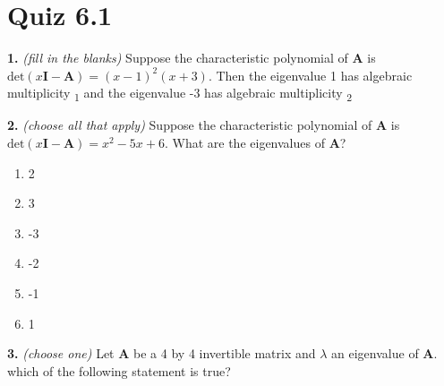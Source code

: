 \documentclass[10pt,a4paper]{article}
\begin{document}
\section{Quiz 6.1}
\textbf{1.} \textit{(fill in the blanks)} Suppose the characteristic polynomial of \(\mathbf{A}\) is \(\text{det}(x\mathbf{I}-\mathbf{A})=(x-1)^2(x+3)\). Then the eigenvalue 1 has algebraic multiplicity  \underline{\hspace{1.2cm}}\textsubscript{1} 
 and the eigenvalue -3 has algebraic multiplicity  \underline{\hspace{1.2cm}}\textsubscript{2}

\smallskip
\textbf{2.} \textit{(choose all that apply)} Suppose the characteristic polynomial of \(\mathbf{A}\) is \(\text{det}(x\mathbf{I}-\mathbf{A})=x^2-5x+6\). What are the eigenvalues of \(\mathbf{A}\)?

\begin{enumerate}[label=(\Alph*)]
\item 2
\item 3
\item -3
\item -2
\item -1
\item 1
\end{enumerate}
\smallskip
\textbf{3.} \textit{(choose one)} Let \(\mathbf{A}\) be a 4 by 4 invertible matrix and \(\lambda\) an eigenvalue of \(\mathbf{A}\). which of the following statement is true?
\end{document}
